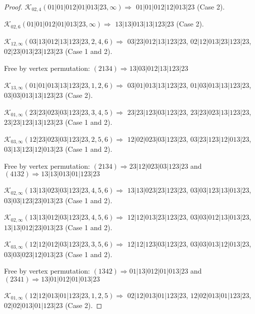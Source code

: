 \documentclass[12pt]{article}
\theoremstyle{plain}
\theoremstyle{definition}
\theoremstyle{remark}
\newcommand{\fancy}[1]{\mathcal{#1}}
\def\K{\fancy{K}}
\begin{document}
\begin{proof}
	$\K_{02,4}(01|01|012|01|013|23,\infty)\Rightarrow $ $01|01|012|12|013|23$ (Case 2).
	
	$\K_{02,6}(01|01|012|01|013|23,\infty)\Rightarrow $ $13|13|013|13|123|23$ (Case 2).
	
	
	\bigskip
	
	$\K_{12,\infty}(03|13|012|13|123|23,2, 4, 6)\Rightarrow $ $03|23|012|13|123|23$, $02|12|013|23|123|23$, $02|23|013|23|123|23$ (Case 1 and 2).
	
	
	
	Free by vertex permutation: $(2 1 3 4)\Rightarrow 13|03|012|13|123|23$
	
	
	\bigskip
	
	$\K_{13,\infty}(01|01|013|13|123|23,1, 2, 6)\Rightarrow $ $03|01|013|13|123|23$, $01|03|013|13|123|23$, $03|03|013|13|123|23$ (Case 2).
	
	\bigskip
	
	$\K_{01,\infty}(23|23|023|03|123|23,3, 4, 5)\Rightarrow $ $23|23|123|03|123|23$, $23|23|023|13|123|23$, $23|23|123|13|123|23$ (Case 1 and 2).
	
	\bigskip
	
	$\K_{03,\infty}(12|23|023|03|123|23,2, 5, 6)\Rightarrow $ $12|02|023|03|123|23$, $03|23|123|12|013|23$, $03|13|123|12|013|23$ (Case 1 and 2).
	
	
	
	Free by vertex permutation: $(2 1 3 4)\Rightarrow 23|12|023|03|123|23$ and $(4 1 3 2)\Rightarrow 13|13|013|01|123|23$
	
	
	\bigskip
	
	$\K_{02,\infty}(13|13|023|03|123|23,4, 5, 6)\Rightarrow $ $13|13|023|23|123|23$, $03|03|123|13|013|23$, $03|03|123|23|013|23$ (Case 1 and 2).
	
	\bigskip
	
	$\K_{02,\infty}(13|13|012|03|123|23,4, 5, 6)\Rightarrow $ $12|12|013|23|123|23$, $03|03|012|13|013|23$, $13|13|012|23|013|23$ (Case 1 and 2).
	
	\bigskip
	
	$\K_{03,\infty}(12|12|012|03|123|23,3, 5, 6)\Rightarrow $ $12|12|123|03|123|23$, $03|03|013|12|013|23$, $03|03|023|12|013|23$ (Case 1 and 2).
	
	
	
	Free by vertex permutation: $(1 3 4 2)\Rightarrow 01|13|012|01|013|23$ and $(2 3 4 1)\Rightarrow 13|01|012|01|013|23$
	
	
	\bigskip
	
	$\K_{01,\infty}(12|12|013|01|123|23,1, 2, 5)\Rightarrow $ $02|12|013|01|123|23$, $12|02|013|01|123|23$, $02|02|013|01|123|23$ (Case 2).
	

\end{proof}
\end{document}
